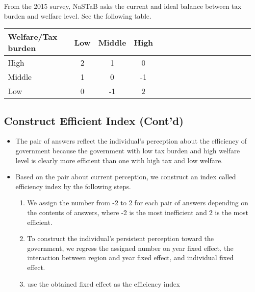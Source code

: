 \documentclass[ review  , 3p ]{elsarticle}
\providecommand{\tightlist}{%
  \setlength{\itemsep}{0pt}\setlength{\parskip}{0pt}}
\begin{document}
  From the 2015 survey, NaSTaB asks the current and ideal balance between tax burden and welfare level.
  See the following table.

  \begin{table}[H]
  \centering\begingroup\fontsize{8}{10}\selectfont

  \begin{tabular}{l|cccl|cccl|cccl|ccc}
  \toprule
  Welfare/Tax burden & Low & Middle & High\\
  \midrule
  High & 2 & 1 & 0\\
  Middle & 1 & 0 & -1\\
  Low & 0 & -1 & 2\\
  \bottomrule
  \end{tabular}
  \endgroup{}
  \end{table}

  \hypertarget{construct-efficient-index-contd}{%
  \subsection{Construct Efficient Index (Cont'd)}\label{construct-efficient-index-contd}}

  \begin{itemize}
  \tightlist
  \item
    The pair of answers reflect the individual's perception about the efficiency of government because the government with low tax burden and high welfare level is clearly more efficient than one with high tax and low welfare.
  \item
    Based on the pair about current perception, we construct an index called efficiency index by the following steps.

    \begin{enumerate}
    \def\labelenumi{\arabic{enumi}.}
    \tightlist
    \item
      We assign the number from -2 to 2 for each pair of answers depending on the contents of answers, where -2 is the most inefficient and 2 is the most efficient.
    \item
      To construct the individual's persistent perception toward the government, we regress the assigned number on year fixed effect, the interaction between region and year fixed effect, and individual fixed effect.
    \item
      use the obtained fixed effect as the efficiency index
    \end{enumerate}
  \end{itemize}
\end{document}

